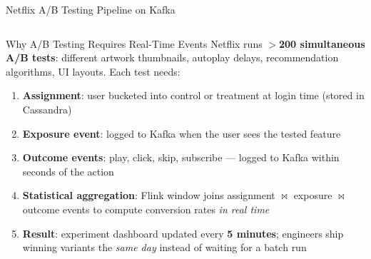 \documentclass[aspectratio=169,10pt]{beamer}
\begin{document}
\begin{frame}{Netflix A/B Testing Pipeline on Kafka}
  \begin{columns}[T]
      \begin{block}{Why A/B Testing Requires Real-Time Events}
        Netflix runs $>$\textbf{200 simultaneous A/B tests}:
        different artwork thumbnails, autoplay delays,
        recommendation algorithms, UI layouts.
        Each test needs:
        \begin{enumerate}
          \item \textbf{Assignment}: user bucketed into control
                or treatment at login time (stored in Cassandra)
          \item \textbf{Exposure event}: logged to Kafka when the
                user sees the tested feature
          \item \textbf{Outcome events}: play, click, skip, subscribe
                — logged to Kafka within seconds of the action
          \item \textbf{Statistical aggregation}: Flink window joins
                assignment $\bowtie$ exposure $\bowtie$ outcome events
                to compute conversion rates \emph{in real time}
          \item \textbf{Result}: experiment dashboard updated every
                \textbf{5 minutes}; engineers ship winning variants
                the \emph{same day} instead of waiting for a batch run
        \end{enumerate}
      \end{block}


\end{columns}
\end{frame}
\end{document}
